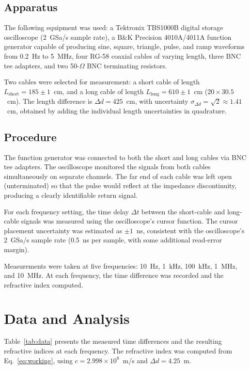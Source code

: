 \documentclass[12pt]{article}
\begin{document}
\subsection{Apparatus}

The following equipment was used: a Tektronix TBS1000B digital storage oscilloscope (2~GSa/s sample rate), a B\&K Precision 4010A/4011A function generator capable of producing sine, square, triangle, pulse, and ramp waveforms from 0.2~Hz to 5~MHz, four RG-58 coaxial cables of varying length, three BNC tee adapters, and two 50-$\Omega$ BNC terminating resistors.

Two cables were selected for measurement: a short cable of length $L_{\text{short}} = 185 \pm 1$~cm, and a long cable of length $L_{\text{long}} = 610 \pm 1$~cm ($20 \times 30.5$~cm). The length difference is $\Delta d = 425$~cm, with uncertainty $\sigma_{\Delta d} = \sqrt{2} \approx 1.41$~cm, obtained by adding the individual length uncertainties in quadrature.

\subsection{Procedure}

The function generator was connected to both the short and long cables via BNC tee adapters. The oscilloscope monitored the signals from both cables simultaneously on separate channels. The far end of each cable was left open (unterminated) so that the pulse would reflect at the impedance discontinuity, producing a clearly identifiable return signal.

For each frequency setting, the time delay $\Delta t$ between the short-cable and long-cable signals was measured using the oscilloscope's cursor function. The cursor placement uncertainty was estimated as $\pm 1$~ns, consistent with the oscilloscope's 2~GSa/s sample rate (0.5~ns per sample, with some additional read-error margin).

Measurements were taken at five frequencies: 10~Hz, 1~kHz, 100~kHz, 1~MHz, and 10~MHz. At each frequency, the time difference was recorded and the refractive index computed.

\section{Data and Analysis}

Table~\ref{tab:data} presents the measured time differences and the resulting refractive indices at each frequency. The refractive index was computed from Eq.~\eqref{eq:working}, using $c = 2.998 \times 10^8$~m/s and $\Delta d = 4.25$~m.
\end{document}
